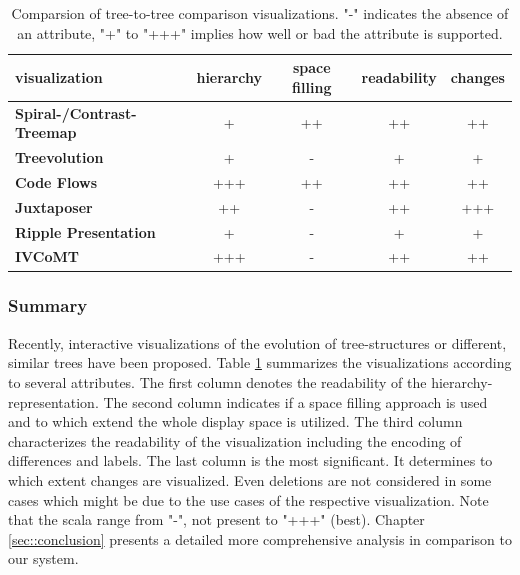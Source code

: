 
\begin{table}[tb]
\centering 
\begin{tabular}[r]{|l|c|c|c|c|} 
\hline
\textbf{visualization} & \textbf{hierarchy} & \textbf{space filling} & \textbf{readability} & \textbf{changes}\\
\hline
\hline
\textbf{Spiral-/Contrast-Treemap} & + & ++\footnotemark & ++ & ++\\
\hline
\textbf{Treevolution} & + & - & + & +\\
\hline
\textbf{Code Flows} & +++ & ++ & ++ & ++\\
\hline
\textbf{Juxtaposer} & ++ & - & ++ & +++\\
\hline
\textbf{Ripple Presentation} & + & - & + & +\\
\hline
\textbf{IVCoMT} & +++ & - & ++ & ++ \\
\hline
\end{tabular}
\label{chap2:comparsion}
\vspace{0.5em} 
\caption{Comparsion of tree-to-tree comparison visualizations. "-" indicates the absence of an attribute, "+" to "+++" implies how well or bad the attribute is supported.}
\end{table}



\subsubsection{Summary}
Recently, interactive visualizations of the evolution of tree-structures or different, similar trees have been proposed. Table \ref{chap2:comparsion} summarizes the visualizations according to several attributes. The first column denotes the readability of the hierarchy-representation. The second column indicates if a space filling approach is used and to which extend the whole display space is utilized. The third column characterizes the readability of the visualization including the encoding of differences and labels. The last column is the most significant. It determines to which extent changes are visualized. Even deletions are not considered in some cases which might be due to the use cases of the respective visualization. Note that the scala range from "-", not present to "+++" (best). Chapter \ref{sec::conclusion} presents a detailed more comprehensive analysis in comparison to our system. 

